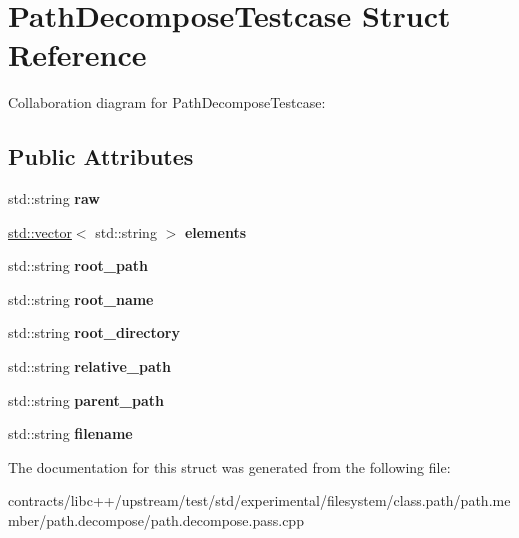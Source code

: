 \hypertarget{struct_path_decompose_testcase}{}\section{Path\+Decompose\+Testcase Struct Reference}
\label{struct_path_decompose_testcase}


Collaboration diagram for Path\+Decompose\+Testcase\+:
\subsection*{Public Attributes}
\begin{DoxyCompactItemize}
\item 
\mbox{\label{struct_path_decompose_testcase_a0f72b5e3b020b9d3f88e67b4cab6032a}} 
std\+::string {\bfseries raw}
\item 
\mbox{\label{struct_path_decompose_testcase_ae30791ce732e36d7ab1cfd0657ee9357}} 
\mbox{\hyperlink{classstd_1_1vector}{std\+::vector}}$<$ std\+::string $>$ {\bfseries elements}
\item 
\mbox{\label{struct_path_decompose_testcase_abc019e720aeff8a4764f9a3b3c4835a6}} 
std\+::string {\bfseries root\+\_\+path}
\item 
\mbox{\label{struct_path_decompose_testcase_a478ea38caf66be2bcc1ff6763e484d3c}} 
std\+::string {\bfseries root\+\_\+name}
\item 
\mbox{\label{struct_path_decompose_testcase_a8c459ba97f2b00c86a3cfefc4a8ca37d}} 
std\+::string {\bfseries root\+\_\+directory}
\item 
\mbox{\label{struct_path_decompose_testcase_a03095938477c9d9d37ad70109c4da04c}} 
std\+::string {\bfseries relative\+\_\+path}
\item 
\mbox{\label{struct_path_decompose_testcase_a951ff291031d96b987ec01252264de75}} 
std\+::string {\bfseries parent\+\_\+path}
\item 
\mbox{\label{struct_path_decompose_testcase_ac589902f603ae118867e0c6d14194ad7}} 
std\+::string {\bfseries filename}
\end{DoxyCompactItemize}


The documentation for this struct was generated from the following file\+:\begin{DoxyCompactItemize}
\item 
contracts/libc++/upstream/test/std/experimental/filesystem/class.\+path/path.\+member/path.\+decompose/path.\+decompose.\+pass.\+cpp\end{DoxyCompactItemize}
